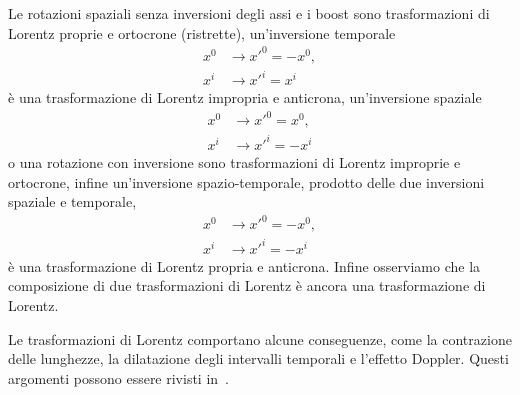 Le rotazioni spaziali senza inversioni degli assi e i boost sono trasformazioni
di Lorentz proprie e ortocrone (ristrette), un'inversione temporale
\begin{subequations}
  \begin{align}
    x^{0} &\to x'^{0} = -x^{0}, \\
    x^{i} &\to x'^{i} = x^{i}
  \end{align}
\end{subequations}
è una trasformazione di Lorentz impropria e anticrona, un'inversione spaziale
\begin{subequations}
  \begin{align}
    x^{0} &\to x'^{0} = x^{0}, \\
    x^{i} &\to x'^{i} = - x^{i}
  \end{align}
\end{subequations}
o una rotazione con inversione sono trasformazioni di Lorentz improprie e
ortocrone, infine un'inversione spazio-temporale, prodotto delle due inversioni
spaziale e temporale,
\begin{subequations}
  \begin{align}
    x^{0} &\to x'^{0} = - x^{0}, \\
    x^{i} &\to x'^{i} = - x^{i}
  \end{align}
\end{subequations}
è una trasformazione di Lorentz propria e anticrona.  Infine osserviamo che la
composizione di due trasformazioni di Lorentz è ancora una trasformazione di
Lorentz.

Le trasformazioni di Lorentz comportano alcune conseguenze, come la contrazione
delle lunghezze, la dilatazione degli intervalli temporali e l'effetto Doppler.
Questi argomenti possono essere rivisti
in~\textcite[29-31]{weinberg:gravitation}.



